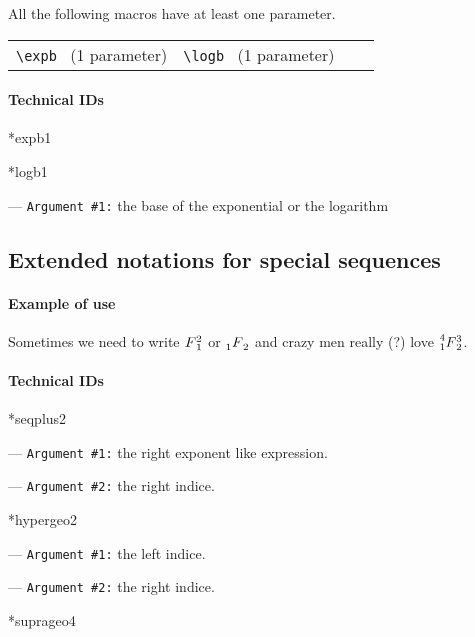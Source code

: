 \documentclass[12pt,a4paper]{article}
\makeatletter
\newcommand\IDmacro{\@ifstar{\@IDmacroStar}{\@IDmacroNoStar}}
\newcommand\@IDmacroNoStar[3]{%
        \texttt{%
        	\textbackslash#1%
        	\IfStrEq{#2}{0}{}{%
        		\,\,[#2 Option%
				\IfStrEq{#2}{1}{}{s}]%
			}%
    	    \,\,(#3 Argument%
				\IfStrEq{#3}{1}{}{s})%
	   	}
        \immediate\write\tempfile{macro@#1@#2@#3}%
    }
\newcommand\@IDmacroStar[2]{%
        \@IDmacroNoStar{#1}{0}{#2}%
    }
\newcommand\@IDoptarg[2]{%
    	\vspace{0.5em}
		--- \texttt{#1 \##2:}%
	}
\newcommand\IDarg[1]{%
    	\@IDoptarg{Argument}{#1}%
	}
\makeatother
\begin{document}
All the following macros have at least one parameter.


\medskip

\begin{tabular*}{\textwidth}%
                {@{\extracolsep{\fill}}*{4}{l}}
    \verb+\expb+ \, (1 parameter) & \verb+\logb+ \, (1 parameter) &  & \\
\end{tabular*}


		\paragraph{Technical IDs}

\IDmacro*{expb}{1}

\IDmacro*{logb}{1}

\IDarg{1} the base of the exponential or the logarithm




\subsection{Extended notations for special sequences}

		\paragraph{Example of use}

\begin{tcblisting}{}
Sometimes we need to write $\seqplus{F}{1}{2}$ or $\hypergeo{F}{1}{2}$
and crazy men really (?) love $\suprageo{F}{1}{2}{3}{4}$.
\end{tcblisting}


		\paragraph{Technical IDs}

\IDmacro*{seqplus}{2}

\IDarg{1} the right exponent like expression.

\IDarg{2} the right indice.


\bigskip


\IDmacro*{hypergeo}{2}

\IDarg{1} the left indice.

\IDarg{2} the right indice.


\bigskip


\IDmacro*{suprageo}{4}
\end{document}
